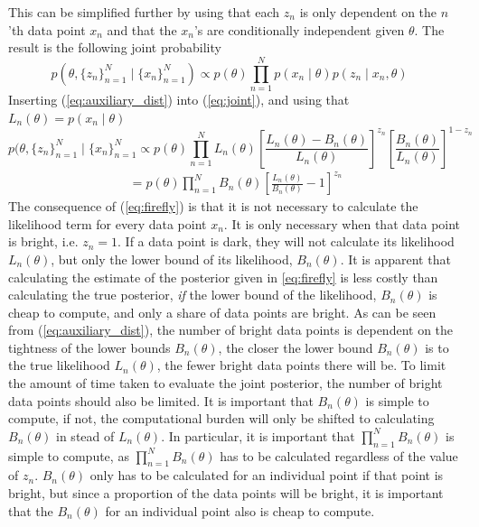  This can be simplified further by using that each $z_n$ is only dependent on the $n$'th data point $x_n$ and that the $x_n$'s are conditionally independent given $\theta$. 
 The result is the following joint probability 
\begin{equation}\label{eq:joint}
           p(\theta, \{z_n\}_{n=1}^N \mid \{x_n\}_{n=1}^N) \propto p(\theta) \prod_{n=1}^N p(x_n\mid\theta)p(z_n\mid x_n, \theta) \quad
\end{equation}
Inserting (\ref{eq:auxiliary_dist}) into (\ref{eq:joint}), and using that $L_n(\theta) = p(x_n\mid\theta)$
\begin{equation}
     p(\theta, \{z_n\}_{n=1}^N\mid\{x_n\}_{n=1}^N \propto p(\theta) \prod_{n=1}^N L_n(\theta)\left[\frac{L_n(\theta) - B_n\left(\theta\right)}{L_n\left(\theta\right)}\right]^{z_n}\left[\frac{B_n\left(\theta\right)}{L_n\left(\theta\right)}\right]^{1-z_n} 
\end{equation}
\begin{equation}
\label{eq:firefly}
\begin{split}
     =p(\theta) \prod_{n = 1}^N
B_n\left(\theta\right) \left[\frac{L_n\left(\theta\right)}{B_n\left(\theta\right)} - 1\right]^{z_n} 
\end{split}
\end{equation}
The consequence of (\ref{eq:firefly}) is that it is not necessary to calculate the likelihood term for every data point $x_n$. 
It is only necessary when that data point is bright, i.e. $z_n = 1$. 
If a data point is dark, they will not calculate its likelihood $L_n(\theta)$, but only the lower bound of its likelihood, $B_n(\theta)$. It is apparent that calculating the estimate of the posterior given in \eqref{eq:firefly} is less costly than calculating the true posterior, \textit{if} the lower bound of the likelihood, $B_n\left(\theta\right)$ is cheap to compute, and only a share of data points are bright. 
As can be seen from (\ref{eq:auxiliary_dist}), the number of bright data points is dependent on the tightness of the lower bounds $B_n(\theta)$, the closer the lower bound $B_n\left(\theta\right)$ is to the true likelihood $L_n\left(\theta\right)$, the fewer bright data points there will be.  
To limit the amount of time taken to evaluate the joint posterior, the number of bright data points should also be limited. 
It is important that $B_n(\theta)$ is simple to compute, if not, the computational burden will only be shifted to calculating $B_n(\theta)$ in stead of $L_n(\theta)$. In particular, it is important that $\prod_{n=1}^N B_n\left(\theta\right)$ is simple to compute, as $\prod_{n=1}^N B_n\left(\theta\right)$ has to be calculated regardless of the value of $z_n$. $B_n\left(\theta\right)$ only has to be calculated for an individual point if that point is bright, but since a proportion of the data points will be bright, it is important that the $B_n\left(\theta\right)$ for an individual point also is cheap to compute.  \\ \\
